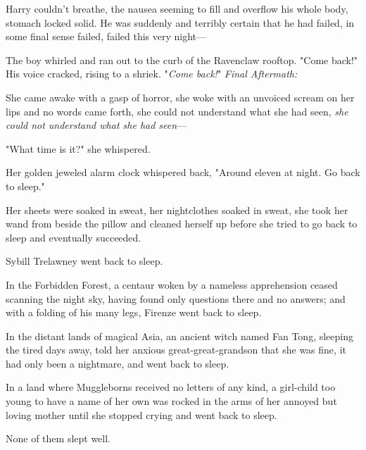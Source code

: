 Harry couldn't breathe, the nausea seeming to fill and overflow his whole body, 
stomach locked solid. He was suddenly and terribly certain that he had failed, 
in some final sense failed, failed this very night---

The boy whirled and ran out to the curb of the Ravenclaw rooftop. "Come back!" 
His voice cracked, rising to a shriek. "\emph{Come back!}"
\sbreak
\emph{Final Aftermath:}

She came awake with a gasp of horror, she woke with an unvoiced scream on her 
lips and no words came forth, she could not understand what she had seen, 
\emph{she could not understand what she had seen}---

"What time is it?" she whispered.

Her golden jeweled alarm clock whispered back, "Around eleven at night. Go back 
to sleep."

Her sheets were soaked in sweat, her nightclothes soaked in sweat, she took her 
wand from beside the pillow and cleaned herself up before she tried to go back 
to sleep and eventually succeeded.

Sybill Trelawney went back to sleep.

In the Forbidden Forest, a centaur woken by a nameless apprehension ceased 
scanning the night sky, having found only questions there and no answers; and 
with a folding of his many legs, Firenze went back to sleep.

In the distant lands of magical Asia, an ancient witch named Fan Tong, sleeping 
the tired days away, told her anxious great-great-grandson that she was fine, 
it had only been a nightmare, and went back to sleep.

In a land where Muggleborns received no letters of any kind, a girl-child too 
young to have a name of her own was rocked in the arms of her annoyed but 
loving mother until she stopped crying and went back to sleep.

None of them slept well.
